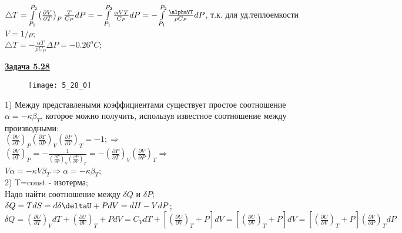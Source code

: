 \documentclass[12pt]{article}
\begin{document}
$\triangle T=\int\limits_{P_1}^{P_2}\left( \frac{\partial V}{\partial T}\right)_P\frac{T}{C_P} dP=-\int\limits_{P_1}^{P_2}\frac{\alpha VT}{C_P} dP=-\int\limits_{P_1}^{P_2}\frac{\alphaVT}{\rho C_P} dP$, т.к. для уд.теплоемкости $V=1/\rho$;\\

$\triangle T=-\frac{\alpha T}{\rho C_P}\Delta P=-0.26^o C$;





\newpage


{\underline\bf Задача 5.28}


\begin{figure}[h]
\texttt{[image: 5\_28\_0]}
\end{figure}

\vspace{1cm}

1) Между представлеными коэффициентами существует простое соотношение $\alpha=-\kappa\beta_T$, которое можно получить, используя известное соотношение между производными:\\

$\left( \frac{\partial V}{\partial T} \right)_P\left( \frac{\partial T}{\partial P} \right)_V\left( \frac{\partial P}{\partial V} \right)_T=-1;\Rightarrow$\\

$\left( \frac{\partial V}{\partial T} \right)_P= -\frac{1}{\left( \frac{\partial T}{\partial P} \right)_V\left( \frac{\partial P}{\partial V} \right)_T}=-\left( \frac{\partial P}{\partial T} \right)_V\left( \frac{\partial V}{\partial P} \right)_T\Rightarrow$\\

$V\alpha=-\kappa V\beta_T\Rightarrow \alpha=-\kappa\beta_T$;\\

2) T=const - изотерма;\\

Надо найти соотношение между $\delta Q$ и $\delta P$;\\

$\delta Q=TdS=d\delta\deltaU+PdV=dH-VdP$;\\


$\delta Q=\left( \frac{\partial U}{\partial T} \right)_V dT+\left( \frac{\partial U}{\partial V} \right)_T+PdV=C_VdT+\left[\left( \frac{\partial U}{\partial V} \right)_T + P\right]dV=\left[\left( \frac{\partial U}{\partial V} \right)_T + P\right]dV=\left[\left( \frac{\partial U}{\partial V} \right)_T + P\right]\left( \frac{\partial V}{\partial P} \right)_T dP$\\
\end{document}
